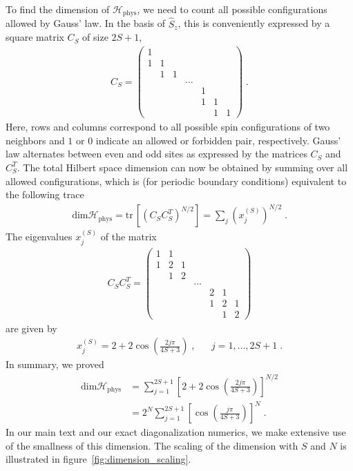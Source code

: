 \documentclass[aps,prl,reprint,twocolumn,superscriptaddress,floatfix,nofootinbib]{revtex4-1}
\begin{document}
To find the dimension of $\mathcal{H}_\text{phys}$, we need to count all possible configurations allowed by Gauss' law. In the basis of $\hat{S}_z$, this is conveniently expressed by a square matrix $C_S$ of size $2S+1$,
\begin{align}
	C_S = \begin{pmatrix}
		1 &   \\
		1 & 1 & \\
		& 1 & 1 & \\
		& &&  \dots   \\
		&&&& 1 \\
		&&& &  1 & 1 & \\
		&&&&& 1&1
	\end{pmatrix} \; .
\end{align}
Here, rows and columns correspond to all possible spin configurations of two neighbors and $1$ or $0$ indicate an allowed or forbidden pair, respectively. Gauss' law alternates between even and odd sites as expressed by the matrices $C_S$ and $C_S^T$. The total Hilbert space dimension can now be obtained by summing over all allowed configurations, which is (for periodic boundary conditions) equivalent to the following trace
\begin{align}
	\text{dim} \mathcal{H}_\text{phys} = \text{tr} \,\left[ \left(C_S C_S^T\right)^{N/2}\right] = \sum_j \left(x^{(S)}_j\right)^{N/2} \; .
\end{align}
The eigenvalues $x^{(S)}_j$ of the matrix
\begin{align}
	C_SC_S^T = \begin{pmatrix}
		1 & 1 & \\
		1 & 2 & 1 & \\
		& 1  & 2 &\\
		&& & \dots \\
		&& && 2 & 1\\
		&&&& 1 & 2 & 1 \\
		&&&& & 1 & 2
	\end{pmatrix}
\end{align}
are given by
\begin{align}
	x^{(S)}_j = 2 + 2 \cos \left(\frac{2j \pi}{4S + 3}\right) \;, && j= 1, \dots, 2S+1 \; .
\end{align}
In summary, we proved
\begin{align}\label{eq:dim_Hphys}
	\text{dim} \mathcal{H}_\text{phys} &= \sum_{j=1}^{2S+1} \left[2 + 2 \cos \left(\frac{2j \pi}{4S + 3}\right)\right]^{N/2} \nonumber \\
	&= 2^{N}\sum_{j=1}^{2S+1} \left[\cos \left(\frac{j \pi}{4S + 3}\right)\right]^{N} \; .
\end{align}
In our main text and our exact diagonalization numerics, we make extensive use of the smallness of this dimension.  The scaling of the dimension with $S$ and $N$ is illustrated in figure~\ref{fig:dimension_scaling}.
\end{document}
